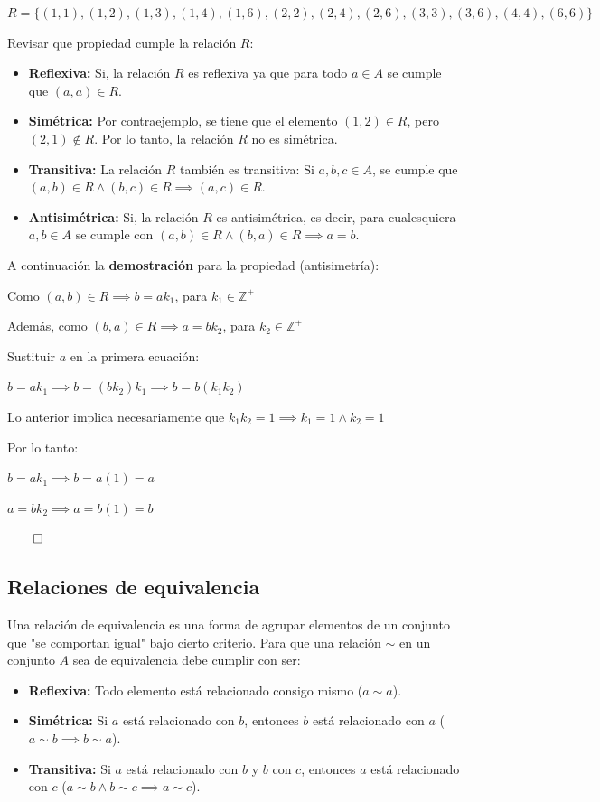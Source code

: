 \documentclass{article}
\begin{document}
$R = \{(1, 1), (1, 2), (1, 3), (1, 4), (1, 6), (2, 2), (2, 4), (2, 6), (3, 3), (3, 6), (4, 4), (6, 6)\}$

Revisar que propiedad cumple la relación $R$:

\begin{itemize}
    \item \textbf{Reflexiva:} Si, la relación $R$ es reflexiva ya que para todo $a \in A$ se cumple que $(a, a) \in R$.
    \item \textbf{Simétrica:} Por contraejemplo, se tiene que el elemento $(1, 2) \in R$, pero $(2, 1) \not \in R$. Por lo tanto, la relación $R$ no es simétrica.
    \item \textbf{Transitiva:} La relación $R$ también es transitiva: Si $a, b, c \in A$, se cumple que $(a, b) \in R \land (b, c) \in R \implies (a, c) \in R$.
    \item \textbf{Antisimétrica:} Si, la relación $R$ es antisimétrica, es decir, para cualesquiera $a, b \in A$ se cumple con $(a, b) \in R \land (b, a) \in R \implies a = b$.
\end{itemize}

A continuación la \textbf{demostración} para la propiedad (antisimetría):

Como $(a, b) \in R \implies b = ak_1$, para $k_1 \in \mathbb{Z}^+$

Además, como $(b, a) \in R \implies a = bk_2$, para $k_2 \in \mathbb{Z}^+$

Sustituir $a$ en la primera ecuación:

$b = ak_1 \implies b = (bk_2)k_1 \implies b = b(k_1k_2)$

Lo anterior implica necesariamente que $k_1k_2 = 1 \implies k_1 = 1 \land k_2 = 1$

Por lo tanto:

$b = ak_1 \implies b = a(1) = a$

$a = bk_2 \implies a = b(1) = b$

$\qed$

\subsection{Relaciones de equivalencia}

Una relación de equivalencia es una forma de agrupar elementos de un conjunto que "se comportan igual" bajo cierto criterio. Para que una relación $\sim$ en un conjunto $A$ sea de equivalencia debe cumplir con ser:

\begin{itemize}
    \item \textbf{Reflexiva:} Todo elemento está relacionado consigo mismo ($a \sim a$).
    \item \textbf{Simétrica:} Si $a$ está relacionado con $b$, entonces $b$ está relacionado con $a$ ($a \sim b \implies b \sim a$).
    \item \textbf{Transitiva:} Si $a$ está relacionado con $b$ y $b$ con $c$, entonces $a$ está relacionado con $c$ ($a \sim b \land b \sim c \implies a \sim c$).
\end{itemize}
\end{document}
